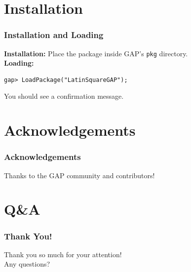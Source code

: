 \documentclass{beamer}
\begin{document}
\begin{frame}
\section{Installation}
\begin{frame}[fragile]
\frametitle{Installation and Loading}
\textbf{Installation:}  
Place the package inside GAP's \texttt{pkg} directory.\\
\textbf{Loading:}
\begin{lstlisting}
gap> LoadPackage("LatinSquareGAP");
\end{lstlisting}
You should see a confirmation message.
\end{frame}


\section{Acknowledgements}
\begin{frame}
\frametitle{Acknowledgements}
Thanks to the GAP community and contributors!
\end{frame}

\section{Q\&A}
\begin{frame}
	\frametitle{Thank You!}
	\centering
	\Large Thank you so much for your attention!\\[1em]
	\Large Any questions?
\end{frame}


\end{frame}
\end{document}
